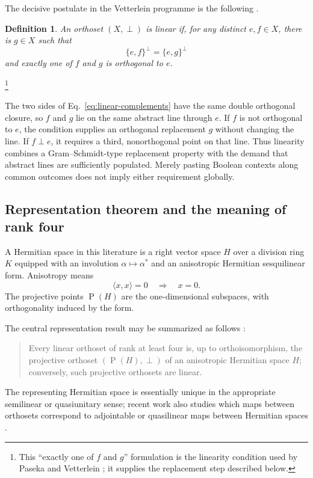 \documentclass[
  aps,
  pra,
  twocolumn,
  amsmath,
  amssymb,
  longbibliography,
  nofootinbib,
  floatfix
]{revtex4-2}
\newtheorem{definition}{Definition}
\newcommand{\Proj}{\operatorname{P}}
\begin{document}
The decisive postulate in the Vetterlein programme is the following
\cite{EmirKrumlPasekaVetterlein2021,PasekaVetterlein2023Linear}.

\begin{definition}
An orthoset $(X,\perp)$ is \emph{linear} if, for any distinct $e,f\in X$, there
is $g\in X$ such that
\begin{equation}
  \{e,f\}^{\perp}=\{e,g\}^{\perp}
  \label{eq:linear-complements}
\end{equation}
and exactly one of $f$ and $g$ is orthogonal to $e$.
\end{definition}
\footnote{This ``exactly one of $f$ and $g$'' formulation is the linearity
condition used by Paseka and Vetterlein
\cite{PasekaVetterlein2023Linear}; it supplies the replacement step described
below.}

The two sides of Eq.~\eqref{eq:linear-complements} have the same double
orthogonal closure, so $f$ and $g$ lie on the same abstract line through $e$.
If $f$ is not orthogonal to $e$, the condition supplies an orthogonal
replacement $g$ without changing the line.  If $f\perp e$, it requires a third,
nonorthogonal point on that line.  Thus linearity combines a Gram--Schmidt-type
replacement property with the demand that abstract lines are sufficiently
populated.  Merely pasting Boolean contexts along common outcomes does not
imply either requirement globally.

\subsection{Representation theorem and the meaning of rank four}

A Hermitian space in this literature is a right vector space $H$ over a
division ring $K$ equipped with an involution $\alpha\mapsto\alpha^*$ and an
anisotropic Hermitian sesquilinear form.  Anisotropy means
\begin{equation}
  \langle x,x\rangle=0\quad\Longrightarrow\quad x=0.
  \label{eq:anisotropy}
\end{equation}
The projective points $\Proj(H)$ are the one-dimensional subspaces, with
orthogonality induced by the form.

The central representation result may be summarized as follows
\cite{PasekaVetterlein2023Linear}:
\begin{quote}
Every linear orthoset of rank at least four is, up to orthoisomorphism, the
projective orthoset $(\Proj(H),\perp)$ of an anisotropic Hermitian space $H$;
conversely, such projective orthosets are linear.
\end{quote}
The representing Hermitian space is essentially unique in the appropriate
semilinear or quasiunitary sense; recent work also studies which maps between
orthosets correspond to adjointable or quasilinear maps between Hermitian
spaces \cite{PasekaVetterlein2025Adjointable}.
\end{document}
